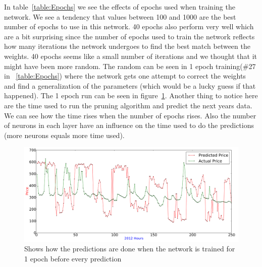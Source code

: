 In table~\ref{table:Epochs} we see the effects of epochs used when training the network. We see a tendency that values between 100 and 1000 are the best number of epochs to use in this network. 40 epochs also perform very well which are a bit surprising since the number of epochs used to train the network reflects how many iterations the network undergoes to find the best match between the weights. 40 epochs seems like a small number of iterations and we thought that it might have been more random. The random can be seen in 1 epoch training(\#27 in ~\ref{table:Epochs}) where the network gets one attempt to correct the weights and find a generalization of the parameters (which would be a lucky guess if that happened). The 1 epoch run can be seen in figure~\ref{fig:1epoch}. Another thing to notice here are the time used to run the pruning algorithm and predict the next years data. We can see how the time rises when the number of epochs rises. Also the number of neurons in each layer have an influence on the time used to do the predictions (more neurons equals more time used).

\begin{figure}[H]
\centering
\includegraphics[width=\linewidth]{billeder/PriceExperimentalAnalysis/1EpochTraining.png}
\caption{Shows how the predictions are done when the network is trained for 1 epoch before every prediction}
\label{fig:1epoch}
\end{figure}

